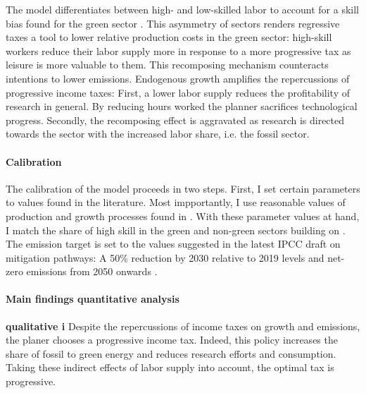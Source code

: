The model differentiates between high- and low-skilled labor to account for a skill bias found for the green sector \citep{Consoli2016DoCapital}. This asymmetry of sectors renders regressive taxes a tool to lower relative production costs in the green sector: high-skill workers reduce their labor supply more in response to a more progressive tax as leisure is more valuable to them. This recomposing mechanism counteracts intentions to lower emissions. %
Endogenous growth amplifies the repercussions of progressive income taxes:
First, a lower labor supply reduces the profitability of research in general. By reducing hours worked the planner sacrifices technological progress. Secondly, the recomposing effect is aggravated as research is directed towards the sector with the increased labor share, i.e. the fossil sector.

\paragraph{Calibration}
The calibration of the model proceeds in two steps. First, I set certain parameters to values found in the literature. Most impportantly, I use reasonable values of production and growth processes found in \cite{Fried2018ClimateAnalysis}. %
With these parameter values at hand, I match the share of high skill in the green and non-green sectors building on \cite{Consoli2016DoCapital}. The emission target is set to the values suggested in the latest IPCC draft on mitigation pathways: A 50\% reduction by 2030 relative to 2019 levels and  net-zero emissions from 2050 onwards \citep{IPCC2022}.

\paragraph{Main findings quantitative analysis}
\textbf{qualitative i}
Despite the repercussions of income taxes on growth and emissions, the planer chooses a progressive income tax. 
Indeed, this policy increases the share of fossil to green energy and reduces research efforts and consumption. Taking these indirect effects of labor supply into account, the optimal tax is progressive. 

